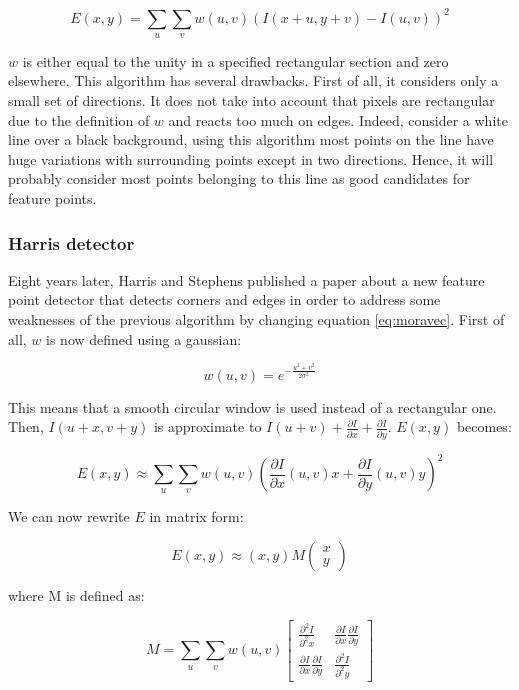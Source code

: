 \documentclass[12pt]{article}
\begin{document}
\begin{equation}  
  \label{eq:moravec}
  E(x,y) = \sum_u \sum_v w(u, v) (I(x+u, y+v) - I(u,v))^2
\end{equation}


$w$ is either equal to the unity in a specified rectangular section and zero elsewhere. This algorithm has several drawbacks. First of all, it considers only a small set of directions. It does not take into account that pixels are rectangular due to the definition of $w$ and reacts too much on edges. Indeed, consider a white line over a black background, using this algorithm most points on the line have huge variations with surrounding points except in two directions. Hence, it will probably consider most points belonging to this line as good candidates for feature points.

\subsubsection{Harris detector}
Eight years later, Harris and Stephens published a paper\cite{Harris88} about a new feature point detector that detects corners and edges in order to address some weaknesses of the previous algorithm by changing  equation \ref{eq:moravec}. First of all, $w$ is now defined using a gaussian:

\[
  w(u, v) = e^{-\frac{u^2+v^2}{2\sigma^2}}
\]

This means that a smooth circular window is used instead of a rectangular one.
Then, $I(u+x, v+y)$ is approximate to $I(u+v) + \frac{\partial I}{\partial x} + \frac{\partial I}{\partial y}$. $E(x, y)$ becomes:

\[
E(x, y) \approx \sum_u \sum_v w(u, v) \left ( \frac{\partial I}{\partial x}(u, v)x + \frac{\partial I}{\partial y}(u, v)y \right ) ^2
\]

We can now rewrite $E$ in matrix form:

\[
E(x,y) \approx (x,y) M  \begin{pmatrix}x\\y\end{pmatrix}
\]

where M is defined as:

\[
  M =  \sum_u \sum_v w(u, v) \left [ \begin{matrix} \frac{\partial^2 I}{\partial^2 x} & \frac{\partial I}{\partial x} \frac{\partial I}{\partial y} \\ \frac{\partial I}{\partial x} \frac{\partial I}{\partial y} & \frac{\partial^2 I}{\partial^2 y} \end{matrix} \right ]
\]
\end{document}
